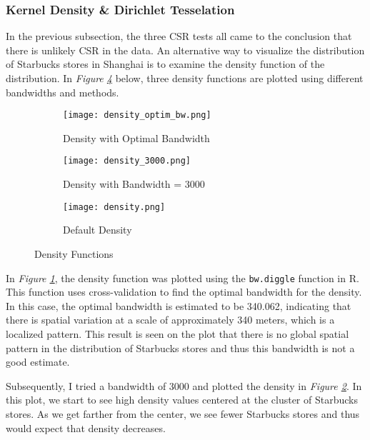 \documentclass{article}
\begin{document}
\subsubsection{Kernel Density \& Dirichlet Tesselation}

In the previous subsection, the three CSR tests all came to the conclusion that there is unlikely CSR in the data. An alternative way to visualize the distribution of Starbucks stores in Shanghai is to examine the density function of the distribution. In \textit{Figure \ref{fig:densities}} below, three density functions are plotted using different bandwidths and methods.

\begin{figure}[htbp]
    \begin{subfigure}[b]{0.3\textwidth}
        \centering
        \texttt{[image: density\_optim\_bw.png]}
        \caption{Density with Optimal Bandwidth}
        \label{fig:density_optim_bw}
    \end{subfigure}
    \hfill
    \begin{subfigure}[b]{0.3\textwidth}
        \centering
        \texttt{[image: density\_3000.png]}
        \caption{Density with Bandwidth = 3000}
        \label{fig:density_3000}
    \end{subfigure}
    \hfill
    \begin{subfigure}[b]{0.3\textwidth}
        \centering
        \texttt{[image: density.png]}
        \caption{Default Density}
        \label{fig:density}
    \end{subfigure}
    \caption{Density Functions}
    \label{fig:densities}
\end{figure}

In \textit{Figure \ref{fig:density_optim_bw}}, the density function was plotted using the \texttt{bw.diggle} function in R. This function uses cross-validation to find the optimal bandwidth for the density. In this case, the optimal bandwidth is estimated to be 340.062, indicating that there is spatial variation at a scale of approximately 340 meters, which is a localized pattern. This result is seen on the plot that there is no global spatial pattern in the distribution of Starbucks stores and thus this bandwidth is not a good estimate.

Subsequently, I tried a bandwidth of 3000 and plotted the density in \textit{Figure \ref{fig:density_3000}}. In this plot, we start to see high density values centered at the cluster of Starbucks stores. As we get farther from the center, we see fewer Starbucks stores and thus would expect that density decreases.
\end{document}
